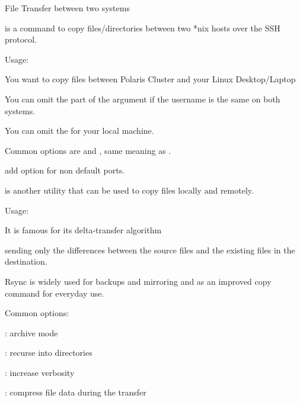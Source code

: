 \documentclass[10pt,t]{beamer}
\begin{document}
\begin{frame}{File Transfer between two systems} 
  \begin{itemize}
    \item {} is a command to copy files/directories between two *nix hosts over the SSH protocol.
    \item Usage: \\
    \item[e.g.] You want to copy files between Polaris Cluster and your Linux Desktop/Laptop
    \item[] 
    \item[] 
    \item You can omit the  part of the argument if the username is the same on both systems.
    \item You can omit the  for your local machine.
    \item Common options are  and , same meaning as .
    \item add  option for non default ports.
      \framebreak
    \item {} is another utility that can be used to copy files locally and remotely.
    \item Usage: 
    \item It is famous for its delta-transfer algorithm
    \item[i.e.] sending only the differences between  the  source  files and  the  existing  files in the destination.  
    \item Rsync is widely used for backups and mirroring and as an improved copy command for everyday use.
    \item Common options:
      {\scriptsize
      \item[] : archive mode
      \item[] : recurse into directories
      \item[] : increase verbosity
      \item[] : compress file data during the transfer
}
\end{itemize}
\end{frame}
\end{document}
